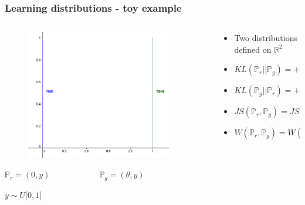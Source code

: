 \documentclass{beamer}
\begin{document}
\begin{frame}
	\frametitle{Learning distributions - toy example}
	\begin{columns}
	\begin{column}{0.5\textwidth}
	\begin{figure}[h!]
		\centering
		\includegraphics[width=0.9\textwidth]{two_lines.png}
	\end{figure}
	\pause
	$\mathbb{P}_r = (0, y) \quad \quad \quad \quad \quad \quad \mathbb{P}_g = (\theta, y)$
	\pause
	\begin{center}
		$y \sim U\big[0, 1\big]$
	\end{center}
	\end{column}
	\begin{column}{0.5\textwidth}  %
	\pause
	\begin{itemize}
		\item Two distributions defined on $\mathbb{R}^2$
			\newline
		\pause
		\item  $ KL(\mathbb{P}_r \vert \vert \mathbb{P}_g) = +\infty$
		\pause
		\item  $ KL(\mathbb{P}_g \vert \vert \mathbb{P}_r) = +\infty$
		\pause
		\item  $ JS(\mathbb{P}_r, \mathbb{P}_g) = JS(\mathbb{P}_g, \mathbb{P}_r) = \log 2 $
		\pause
		\item  $ W(\mathbb{P}_r, \mathbb{P}_g) = W(\mathbb{P}_g, \mathbb{P}_r) = \vert \theta \vert $
	\end{itemize}
	\end{column}
	\end{columns}
\end{frame}
\end{document}
